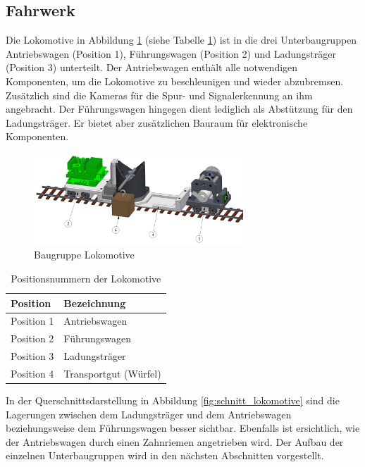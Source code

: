 \documentclass[../../main.tex]{subfiles}
\begin{document}
    \subsection{Fahrwerk}
    Die Lokomotive in Abbildung \ref{fig:bg_lokomotive} (siehe Tabelle \ref{tab:bg_lokomotive}) ist in die drei Unterbaugruppen Antriebswagen (Position 1), Führungswagen (Position 2) und Ladungsträger (Position 3) unterteilt. Der Antriebswagen enthält alle notwendigen Komponenten, um die Lokomotive zu beschleunigen und wieder abzubremsen. Zusätzlich sind die Kameras für die Spur- und Signalerkennung an ihm angebracht. Der Führungswagen hingegen dient lediglich als Abstützung für den Ladungsträger. Er bietet aber zusätzlichen Bauraum für elektronische Komponenten.\\

    \begin{figure}[H] %
        \centering
        \includegraphics[width=0.7\textwidth]{Lokomotive.png}
        \caption{Baugruppe Lokomotive}
        \label{fig:bg_lokomotive}
    \end{figure}

    \begin{table}[H] \centering
        \begin{tabular}{|l|l|}
        \hline
        \textbf{Position} & \textbf{Bezeichnung}\\
        \hline
        Position 1          & Antriebswagen\\
         \hline
        Position 2          & Führungswagen\\
        \hline
        Position 3          & Ladungsträger\\
        \hline
        Position 4          & Transportgut (Würfel)\\
        \hline
        \end{tabular}

        \caption{Positionsnummern der Lokomotive}
        \label{tab:bg_lokomotive}
    \end{table}

    In der Querschnittsdarstellung in Abbildung \ref{fig:schnitt_lokomotive} sind die Lagerungen zwischen dem Ladungsträger und dem Antriebswagen beziehungsweise dem Führungswagen besser sichtbar. Ebenfalls ist ersichtlich, wie der Antriebswagen durch einen Zahnriemen angetrieben wird. Der Aufbau der einzelnen Unterbaugruppen wird in den nächsten Abschnitten vorgestellt.\\
\end{document}
